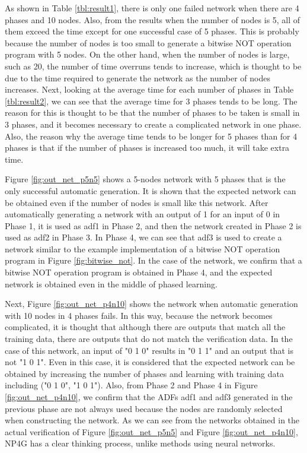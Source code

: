 \documentclass{article}
\begin{document}
As shown in Table \ref{tbl:result1}, there is only one failed network when there are 4 phases and 10 nodes.
Also, from the results when the number of nodes is 5, all of them exceed the time except for one successful case of 5 phases.
This is probably because the number of nodes is too small to generate a bitwise NOT operation program with 5 nodes.
On the other hand, when the number of nodes is large, such as 20, the number of time overruns tends to increase, which is thought to be due to the time required to generate the network as the number of nodes increases.
Next, looking at the average time for each number of phases in Table  \ref{tbl:result2}, we can see that the average time for 3 phases tends to be long.
The reason for this is thought to be that the number of phases to be taken is small in 3 phases, and it becomes necessary to create a complicated network in one phase.
Also, the reason why the average time tends to be longer for 5 phases than for 4 phases is that if the number of phases is increased too much, it will take extra time.

Figure \ref{fig:out_net_p5n5} shows a 5-nodes network with 5 phases that is the only successful automatic generation.
It is shown that the expected network can be obtained even if the number of nodes is small like this network.
After automatically generating a network with an output of 1 for an input of 0 in Phase 1, it is used as adf1 in Phase 2, and then the network created in Phase 2 is used as adf2 in Phase 3.
In Phase 4, we can see that adf3 is used to create a network similar to the example implementation of a bitwise NOT operation program in Figure \ref{fig:bitwise_not}.
In the case of the network, we confirm that a bitwise NOT operation program is obtained in Phase 4, and the expected network is obtained even in the middle of phased learning.

Next, Figure \ref{fig:out_net_p4n10} shows the network when automatic generation with 10 nodes in 4 phases fails.
In this way, because the network becomes complicated, it is thought that although there are outputs that match all the training data, there are outputs that do not match the verification data.
In the case of this network, an input of "0 1 0" results in "0 1 1" and an output that is not "1 0 1".
Even in this case, it is considered that the expected network can be obtained by increasing the number of phases and learning with training data including ("0 1 0", "1 0 1").
Also, from Phase 2 and Phase 4 in Figure \ref{fig:out_net_p4n10}, we confirm that the ADFs adf1 and adf3 generated in the previous phase are not always used because the nodes are randomly selected when constructing the network.
As we can see from the networks obtained in the actual verification of Figure \ref{fig:out_net_p5n5} and Figure \ref{fig:out_net_p4n10}, NP4G has a clear thinking process, unlike methods using neural networks.
\end{document}
